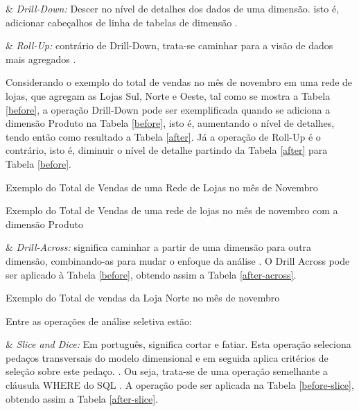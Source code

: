 {\begin{easylist}[itemize]
& \textit{Drill-Down:} Descer no nível de detalhes dos dados de uma dimensão. isto é, adicionar cabeçalhos de linha de tabelas de dimensão \cite{Kimball2002}.

& \textit{Roll-Up:} contrário de Drill-Down, trata-se caminhar para a visão de dados mais agregados . 


\end{easylist}

Considerando o exemplo do total de vendas no mês de novembro em uma rede de lojas, que agregam as Lojas Sul, Norte e Oeste, tal como se mostra a Tabela \ref{before}, a operação Drill-Down pode ser exemplificada quando se adiciona a dimensão Produto na Tabela \ref{before}, isto é, aumentando o nível de detalhes, tendo então como resultado a Tabela \ref{after}. Já a operação de Roll-Up é o contrário, isto é, diminuir o nível de detalhe partindo da Tabela 
\ref{after} para Tabela \ref{before}.

\begin{table}[!ht]
\centering

\caption{Exemplo do Total de Vendas de uma Rede de Lojas no mês de Novembro}
\label{before}
\end{table}
\FloatBarrier


\begin{table}[!ht]
\centering

\caption{Exemplo do Total de Vendas de uma rede de lojas no mês de novembro com a dimensão Produto}
\label{after}
\end{table}

\begin{easylist}[itemize]

& \textit{Drill-Across:} significa caminhar a partir de uma dimensão para
outra dimensão, combinando-as para mudar o enfoque da
análise \cite{andre2000}. O Drill Across pode ser aplicado à Tabela \ref{before}, obtendo assim a Tabela \ref{after-across}.
\end{easylist}

\begin{table}[!ht]
\centering

\caption{Exemplo do Total de vendas da Loja Norte no mês de novembro}
\label{after-across}
\end{table}
\FloatBarrier

Entre as operações de análise seletiva estão:

\begin{easylist}[itemize]

& \textit{Slice and Dice:} Em português, significa cortar e fatiar. Esta operação seleciona pedaços transversais do modelo dimensional e em seguida aplica critérios de seleção sobre este pedaço. \cite{andre2000}. Ou seja, trata-se de uma operação semelhante a cláusula WHERE do SQL \cite{valeria2012}. A operação pode ser aplicada na Tabela \ref{before-slice}, obtendo assim a Tabela \ref{after-slice}.



\end{easylist}}
